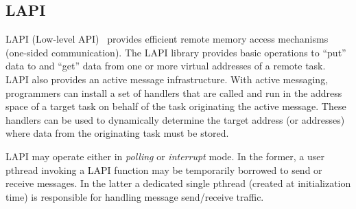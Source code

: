 \subsection{LAPI}

LAPI (Low-level API)~\cite{lapi} provides efficient remote memory access
mechanisms (one-sided communication).  The LAPI library provides basic
operations to ``put'' data to and ``get'' data from one or more
virtual addresses of a remote task.  LAPI also provides an active
message infrastructure. With active messaging, programmers can install
a set of handlers that are called and run in the address space of a
target task on behalf of the task originating the active message.
These handlers can be used to dynamically determine the target address
(or addresses) where data from the originating task must be stored.

LAPI may operate either in {\em polling} or {\em interrupt} mode. In the former, a
user pthread invoking a LAPI function may be temporarily borrowed to
send or receive messages. In the latter a dedicated single pthread
(created at initialization time) is responsible for handling message
send/receive traffic.

